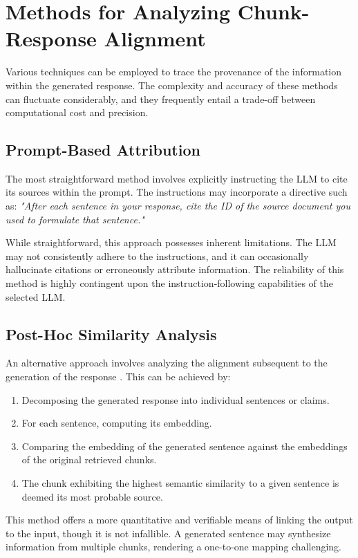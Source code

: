\section{Methods for Analyzing Chunk-Response Alignment}
Various techniques can be employed to trace the provenance of the information within the generated response. The complexity and accuracy of these methods can fluctuate considerably, and they frequently entail a trade-off between computational cost and precision.

\subsection{Prompt-Based Attribution}
The most straightforward method involves explicitly instructing the LLM to cite its sources within the prompt. The instructions may incorporate a directive such as: \textit{"After each sentence in your response, cite the ID of the source document you used to formulate that sentence."} \autocite{gao2024retrievalaugmented}

While straightforward, this approach possesses inherent limitations. The LLM may not consistently adhere to the instructions, and it can occasionally hallucinate citations or erroneously attribute information. The reliability of this method is highly contingent upon the instruction-following capabilities of the selected LLM.

\subsection{Post-Hoc Similarity Analysis}
An alternative approach involves analyzing the alignment subsequent to the generation of the response \autocite{gao2024retrievalaugmented}. This can be achieved by:
\begin{enumerate}
    \item Decomposing the generated response into individual sentences or claims.
    \item For each sentence, computing its embedding.
    \item Comparing the embedding of the generated sentence against the embeddings of the original retrieved chunks.
    \item The chunk exhibiting the highest semantic similarity to a given sentence is deemed its most probable source.
\end{enumerate}
This method offers a more quantitative and verifiable means of linking the output to the input, though it is not infallible. A generated sentence may synthesize information from multiple chunks, rendering a one-to-one mapping challenging.

